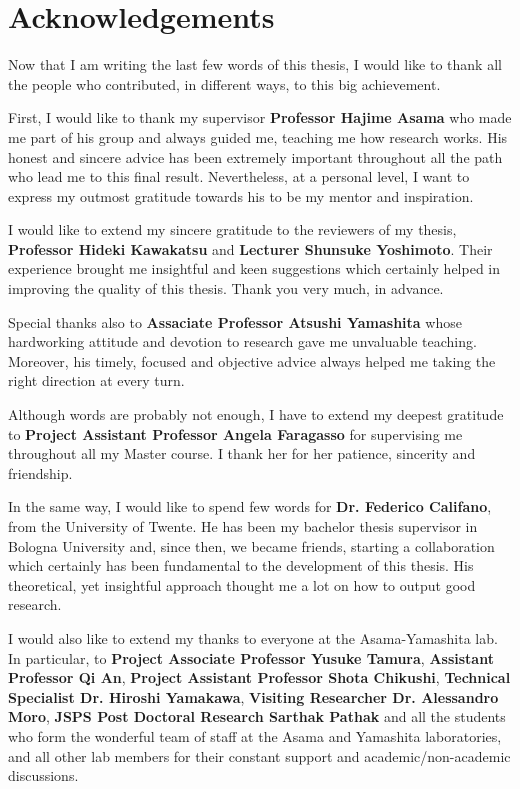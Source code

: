 \chapter*{Acknowledgements}
\lhead[Acknowledgements]{}

\thispagestyle{empty}

\newpage
Now that I am writing the last few words of this thesis, I would like to thank all the people who contributed, in different ways, to this big achievement. 

First, I would like to thank my supervisor \textbf{Professor Hajime Asama} who made me part of his group and always guided me, teaching me how research works. His honest and sincere advice has been extremely important throughout all the path who lead me to this final result. Nevertheless, at a personal level, I want to express my outmost gratitude towards his to be my mentor and inspiration.

I would like to extend my sincere gratitude to the reviewers of my thesis, \textbf{Professor Hideki Kawakatsu} and \textbf{Lecturer Shunsuke Yoshimoto}. Their experience brought me insightful and keen suggestions which certainly helped in improving the quality of this thesis. Thank you very much, in advance.

Special thanks also to \textbf{Assaciate Professor Atsushi Yamashita} whose hardworking attitude and devotion to research gave me unvaluable teaching. Moreover, his timely, focused and objective advice always helped me taking the right direction at every turn. 

Although words are probably not enough, I have to extend my deepest gratitude to \textbf{Project Assistant Professor Angela Faragasso} for supervising me throughout all my Master course. I thank her for her patience, sincerity and friendship. 

In the same way, I would like to spend few words for \textbf{Dr. Federico Califano}, from the University of Twente. He has been my bachelor thesis supervisor in Bologna University and, since then, we became friends, starting a collaboration which certainly has been fundamental to the development of this thesis. His theoretical, yet insightful approach thought me a lot on how to output good research.

I would also like to extend my thanks to everyone at the Asama-Yamashita lab. In particular, to  \textbf{Project Associate Professor Yusuke Tamura}, \textbf{Assistant Professor Qi An}, \textbf{Project Assistant Professor Shota Chikushi}, \textbf{Technical Specialist Dr. Hiroshi Yamakawa}, \textbf{Visiting Researcher Dr. Alessandro Moro}, \textbf{JSPS Post Doctoral Research Sarthak Pathak} and all the students who form the wonderful team of staff at the Asama and Yamashita laboratories, and all other lab members for their constant support and academic/non-academic discussions.

